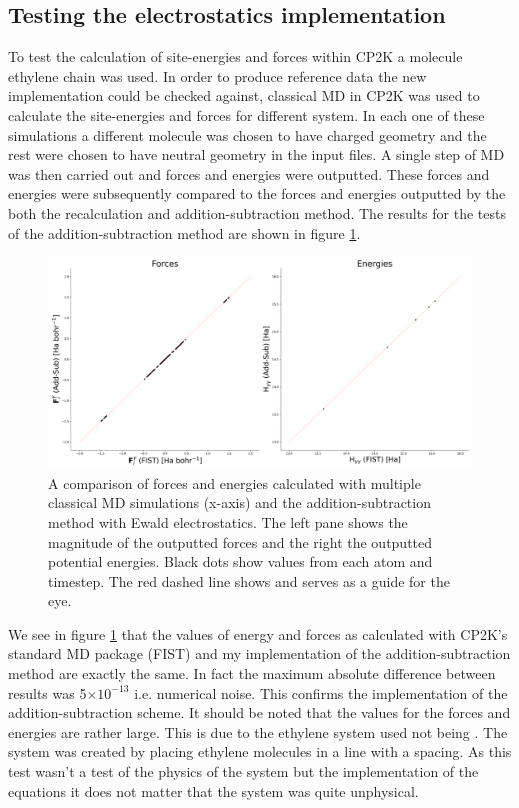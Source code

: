 \subsection{Testing the electrostatics implementation}
\label{sect:testESimp}
To test the calculation of site-energies and forces within CP2K a  molecule ethylene chain was used. In order to produce reference data the new implementation could be checked against, classical MD in CP2K was used to calculate the site-energies and forces for  different system. In each one of these simulations a different molecule was chosen to have charged geometry and the rest were chosen to have neutral geometry in the input files. A single step of MD was then carried out and forces and energies were outputted. These forces and energies were subsequently compared to the forces and energies outputted by the both the recalculation and addition-subtraction method. The results for the tests of the addition-subtraction method are shown in figure \ref{fig:AddSubEwaldTest}.
\begin{figure}[ht]
  \includegraphics[width=\textwidth]{../img/ES/10_mol_FIST.png}
	\caption{\label{fig:AddSubEwaldTest}A comparison of forces and energies calculated with multiple classical MD simulations (x-axis) and the addition-subtraction method with Ewald electrostatics. The left pane shows the magnitude of the outputted forces and the right the outputted potential energies. Black dots show values from each atom and timestep. The red dashed line shows  and serves as a guide for the eye.}
\end{figure}
We see in figure \ref{fig:AddSubEwaldTest} that the values of energy and forces as calculated with CP2K's standard MD package (FIST) and my implementation of the addition-subtraction method are exactly the same. In fact the maximum absolute difference between results was 5$\times 10^{-13}$ i.e. numerical noise. This confirms the implementation of the addition-subtraction scheme. It should be noted that the values for the forces and energies are rather large. This is due to the ethylene system used not being . The system was created by placing  ethylene molecules in a line with a   spacing. As this test wasn't a test of the physics of the system but the implementation of the equations it does not matter that the system was quite unphysical.
